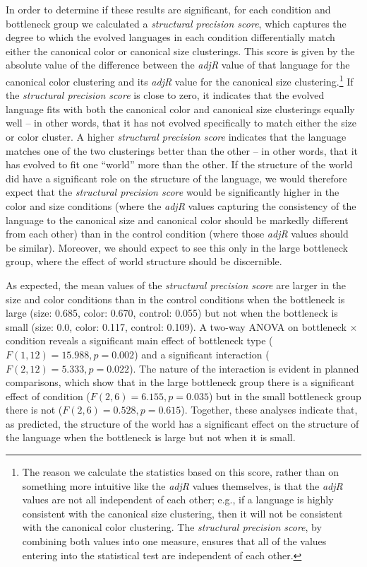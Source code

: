 \documentclass{apa}
\begin{document}
In order to determine if these results are significant, for each condition and bottleneck group we calculated a {\it structural precision score}, which captures the degree to which the evolved languages in each condition differentially match either the canonical color or canonical size clusterings. This score is given by the absolute value of the difference between the {\it adjR} value of that language for the canonical color clustering and its {\it adjR} value for the canonical size clustering.\footnote{The reason we calculate the statistics based on this score, rather than on something more intuitive like the {\it adjR} values themselves, is that the {\it adjR} values are not all independent of each other; e.g., if a language is highly consistent with the canonical size clustering, then it will not be consistent with the canonical color clustering. The {\it structural precision score}, by combining both values into one measure, ensures that all of the values entering into the statistical test are independent of each other.} If the {\it structural precision score} is close to zero, it indicates that the evolved language fits with both the canonical color and canonical size clusterings equally well -- in other words, that it has not evolved specifically to match either the size or color cluster. A higher {\it structural precision score} indicates that the language matches one of the two clusterings  better than the other -- in other words, that it has evolved to fit one ``world'' more than the other. If the structure of the world did have a significant role on the structure of the language, we would therefore expect that the {\it structural precision score} would be significantly higher in the {\sc color} and {\sc size} conditions (where the {\it adjR} values capturing the consistency of the language to the canonical size and canonical color should be markedly different from each other) than in the {\sc control} condition (where those {\it adjR} values should be similar). Moreover, we should expect to see this only in the {\sc large} bottleneck group, where the effect of world structure should be discernible.


As expected, the mean values of the {\it structural precision score} are larger in the {\sc size} and {\sc color} conditions than in the {\sc control} conditions when the bottleneck is large ({\sc size}: 0.685, {\sc color}: 0.670, {\sc control}: 0.055) but not when the bottleneck is small ({\sc size}: 0.0, {\sc color}: 0.117, {\sc control}: 0.109). A two-way ANOVA on bottleneck $\times$ condition reveals a significant main effect of bottleneck type ($F(1,12)=15.988, p=0.002$) and a significant interaction ($F(2,12)=5.333, p=0.022$). The nature of the interaction is evident in planned comparisons, which show that in the {\sc large} bottleneck group there is a significant effect of condition ($F(2,6)=6.155, p=0.035$) but in the {\sc small} bottleneck group there is not ($F(2,6)=0.528, p=0.615$). Together, these analyses indicate that, as predicted, the structure of the world has a significant effect on the structure of the language when the bottleneck is {\sc large} but not when it is {\sc small}.
\end{document}
